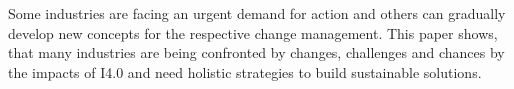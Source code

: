 Some industries are facing an urgent demand for action and others can gradually develop new concepts for the respective change management. This paper shows, that many industries are being confronted by changes, challenges and chances by the impacts of \ac{I4.0} and need holistic strategies to build sustainable solutions.


